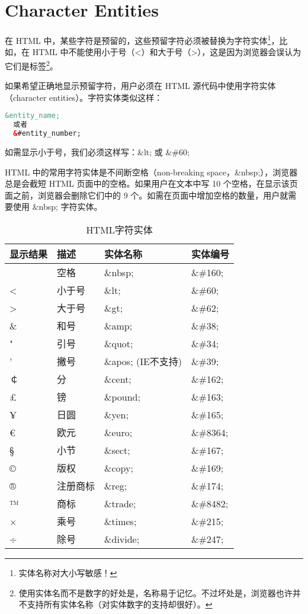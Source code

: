 \section{Character Entities}


在 HTML 中，某些字符是预留的，这些预留字符必须被替换为字符实体\footnote{实体名称对大小写敏感！}，比如，在 HTML 中不能使用小于号（<）和大于号（>），这是因为浏览器会误认为它们是标签\footnote{使用实体名而不是数字的好处是，名称易于记忆。不过坏处是，浏览器也许并不支持所有实体名称（对实体数字的支持却很好）。}。

如果希望正确地显示预留字符，用户必须在 HTML 源代码中使用字符实体（character entities）。字符实体类似这样：

\begin{lstlisting}[language=HTML]
  &entity_name;
  或者
  &#entity_number;
\end{lstlisting}

如需显示小于号，我们必须这样写：\&lt; 或 \&\#60;

HTML 中的常用字符实体是不间断空格（non-breaking space，\&nbsp;），浏览器总是会截短 HTML 页面中的空格。如果用户在文本中写 10 个空格，在显示该页面之前，浏览器会删除它们中的 9 个。如需在页面中增加空格的数量，用户就需要使用 \&nbsp; 字符实体。

\begin{table}[!h]
\centering
\caption{HTML字符实体}
\begin{tabular}{|l|l|l|l|}
\hline
显示结果		&描述		&实体名称	&实体编号	\\
\hline
 			&空格		&\&nbsp;		&\&\#160;	\\
\hline
<			&小于号		&\&lt;		&\&\#60;	\\
\hline
>			&大于号		&\&gt;		&\&\#62;	\\
\hline
\&			&和号		&\&amp;		&\&\#38;\\
\hline
"			&引号		&\&quot;		&\&\#34;\\
\hline
'			&撇号 		&\&apos; (IE不支持)&\&\#39;\\
\hline
￠			&分			&\&cent;		&\&\#162;\\
\hline
£			&镑			&\&pound;	&\&\#163;\\
\hline
¥			&日圆		&\&yen;		&\&\#165;\\
\hline
€			&欧元		&\&euro;		&\&\#8364;\\
\hline
§			&小节		&\&sect;		&\&\#167;\\
\hline
©			&版权		&\&copy;		&\&\#169;\\
\hline
®			&注册商标	&\&reg;		&\&\#174;\\
\hline
™			&商标		&\&trade;	&\&\#8482;\\
\hline
×			&乘号		&\&times;	&\&\#215;\\
\hline
÷			&除号		&\&divide;	&\&\#247;\\
\hline
\end{tabular}
\end{table}


